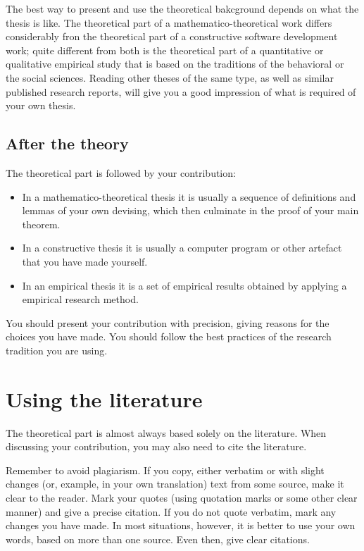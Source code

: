 \documentclass[utf8,bachelor,english]{gradu3}
\begin{document}
The best way to present and use the theoretical bakcground depends on
what the thesis is like.  The theoretical part of a
mathematico-theoretical work differs considerably fron the theoretical
part of a constructive software development work; quite different from
both is the theoretical part of a quantitative or qualitative
empirical study that is based on the traditions of the behavioral or
the social sciences.  Reading other theses of the same type, as well
as similar published research reports, will give you a good impression
of what is required of your own thesis.

\section{After the theory}

The theoretical part is followed by your contribution:
\begin{itemize}
\item In a mathematico-theoretical thesis it is usually a sequence of
  definitions and lemmas of your own devising, which then culminate in
  the proof of your main theorem.
\item In a constructive thesis it is usually a computer program or
  other artefact that you have made yourself.
\item In an empirical thesis it is a set of empirical results obtained
  by applying a empirical research method.
\end{itemize}

You should present your contribution with precision, giving reasons
for the choices you have made.  You should follow the best practices
of the research tradition you are using.

\chapter{Using the literature}

The theoretical part is almost always based solely on the literature.
When discussing your contribution, you may also need to cite the
literature.

Remember to avoid plagiarism.  If you copy, either verbatim or with
slight changes (or, example, in your own translation) text from some
source, make it clear to the reader.  Mark your quotes (using
quotation marks or some other clear manner) and give a precise
citation.  If you do not quote verbatim, mark any changes you have
made.  In most situations, however, it is better to use your own
words, based on more than one source.  Even then, give clear
citations.
\end{document}
